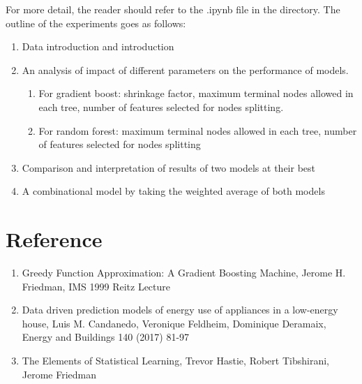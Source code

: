 \documentclass{article}
\begin{document}
For more detail, the reader should refer to the .ipynb file in the directory. The outline of the experiments goes as follows:
\begin{enumerate}
\item
Data introduction and introduction
\item
An analysis of impact of different parameters on the performance of models.
\begin{enumerate}
\item
For gradient boost: shrinkage factor, maximum terminal nodes allowed in each tree, number of features selected for nodes splitting.
\item
For random forest: maximum terminal nodes allowed in each tree, number of features selected for nodes splitting
\end{enumerate}
\item
Comparison and interpretation of results of two models at their best
\item
A combinational model by taking the weighted average of both models
\end{enumerate}
\section{Reference}
\begin{enumerate}
\item
Greedy Function Approximation: A Gradient Boosting Machine, Jerome H. Friedman, IMS 1999 Reitz Lecture
\item
Data driven prediction models of energy use of appliances in a low-energy house, Luis M. Candanedo, Veronique Feldheim, Dominique Deramaix, Energy and Buildings 140 (2017) 81-97
\item
The Elements of Statistical Learning, Trevor Hastie, Robert Tibshirani, Jerome Friedman
\end{enumerate}
\end{document}
